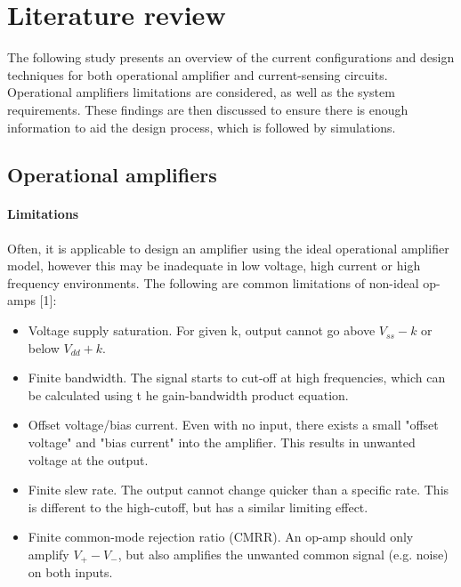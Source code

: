 
\chapter{Literature review}\label{chap:Lit}

The following study presents an overview of the current configurations and design techniques for both operational amplifier and current-sensing circuits.
Operational amplifiers limitations are considered, as well as the system requirements. These findings are then discussed to ensure there is
enough information to aid the design process, which is followed by simulations.

\section{Operational amplifiers}\label{sec:opamps}

\subsubsection{Limitations}\label{sec:opamps_limits}
Often, it is applicable to design an amplifier using the ideal operational amplifier model, however this may be inadequate
in low voltage, high current or high frequency environments. The following are common limitations of non-ideal op-amps [1]:
\begin{itemize}
    \item Voltage supply saturation. For given k, output cannot go above $V_{ss} - k$ or below  $V_{dd} + k$.
    \item Finite bandwidth. The signal starts to cut-off at high frequencies, which can be calculated using t   he gain-bandwidth product equation.
    \item Offset voltage/bias current. Even with no input, there exists a small "offset voltage" and "bias current" into the amplifier.
          This results in unwanted voltage at the output.
    \item Finite slew rate. The output cannot change quicker than a specific rate. This is different to the high-cutoff, but has a similar limiting effect.
    \item Finite common-mode rejection ratio (CMRR). An op-amp should only amplify $V_{+} - V_{-}$, but also amplifies the unwanted common signal (e.g. noise) on both inputs.
\end{itemize}

